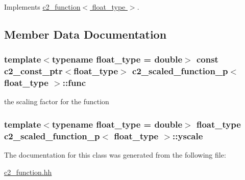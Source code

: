 Implements \hyperlink{classc2__function_a44e0201159111350be7f746fc9026f67}{c2\+\_\+function$<$ float\+\_\+type $>$}.



\subsection{Member Data Documentation}
\subsubsection[{\texorpdfstring{func}{func}}]{\setlength{\rightskip}{0pt plus 5cm}template$<$typename float\+\_\+type = double$>$ const {\bf c2\+\_\+const\+\_\+ptr}$<$float\+\_\+type$>$ {\bf c2\+\_\+scaled\+\_\+function\+\_\+p}$<$ float\+\_\+type $>$\+::func\hspace{0.3cm}{\ttfamily [protected]}}\hypertarget{classc2__scaled__function__p_a4ee175f7c60c6967c44418062b93cbbb}{}\label{classc2__scaled__function__p_a4ee175f7c60c6967c44418062b93cbbb}


the scaling factor for the function 

\subsubsection[{\texorpdfstring{yscale}{yscale}}]{\setlength{\rightskip}{0pt plus 5cm}template$<$typename float\+\_\+type = double$>$ float\+\_\+type {\bf c2\+\_\+scaled\+\_\+function\+\_\+p}$<$ float\+\_\+type $>$\+::yscale\hspace{0.3cm}{\ttfamily [protected]}}\hypertarget{classc2__scaled__function__p_a4ea4ca9743bd3783752a9ee5de49ef0f}{}\label{classc2__scaled__function__p_a4ea4ca9743bd3783752a9ee5de49ef0f}


The documentation for this class was generated from the following file\+:\begin{DoxyCompactItemize}
\item 
\hyperlink{c2__function_8hh}{c2\+\_\+function.\+hh}\end{DoxyCompactItemize}

